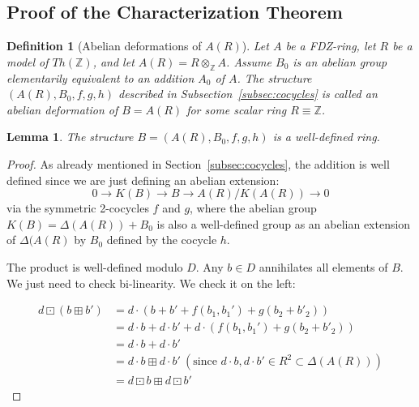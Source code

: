 \documentclass{article}
\newtheorem{definition}{Definition}[section]
\newtheorem{lemma}[theorem]{Lemma}
\theoremstyle{remark}
\def\Z{{\mathbb{Z}}}
\begin{document}
\subsection{Proof of the Characterization Theorem}
\begin{definition}[Abelian deformations of $A(R)$]
Let $A$ be a FDZ-ring, let $R$ be a model of  $Th(\Z)$, and let $A(R)=R\otimes_\Z A$. Assume $B_0$ is an abelian group elementarily equivalent to an addition $A_0$ of $A$. The structure $(A(R),B_0,f,g,h)$ described in Subsection~\ref{subsec:cocycles} is called an abelian deformation of $B=A(R)$ for some scalar ring $R\equiv \Z$.
\end{definition}
\begin{lemma} The structure $B=(A(R),B_0,f,g,h)$ is a well-defined ring.\end{lemma}
\begin{proof} As already mentioned in Section~\ref{subsec:cocycles}, the addition is well defined since we are just defining an abelian extension:
$$0\to K(B)\to B \to A(R)/K(A(R)) \to 0$$
via the symmetric 2-cocycles $f$ and $g$, where the abelian group $K(B)=\Delta(A(R))+B_0$ is also a well-defined group as an abelian extension of $\Delta(A(R)$ by $B_0$ defined by the cocycle $h$. 

The product is well-defined modulo $D$. Any $b\in D$ annihilates all elements of $B$.  We just need to check bi-linearity. We check it on the left:

\begin{align*} d\boxdot(b\boxplus b')&= d\cdot  (b+b'+f(b_1,b_1')+g(b_2+b'_2))\\
&=d\cdot b +d\cdot b' +d\cdot(f(b_1,b_1')+g(b_2+b'_2)) \\
&=d\cdot b +d\cdot b'\\
&=d\cdot b \boxplus d\cdot b'~ (\textrm{since $d\cdot b, d\cdot b' \in R^2\subset \Delta(A(R))$}) \\
&=d\boxdot b \boxplus d\boxdot b'\end{align*}
\end{proof} 
\end{document}
